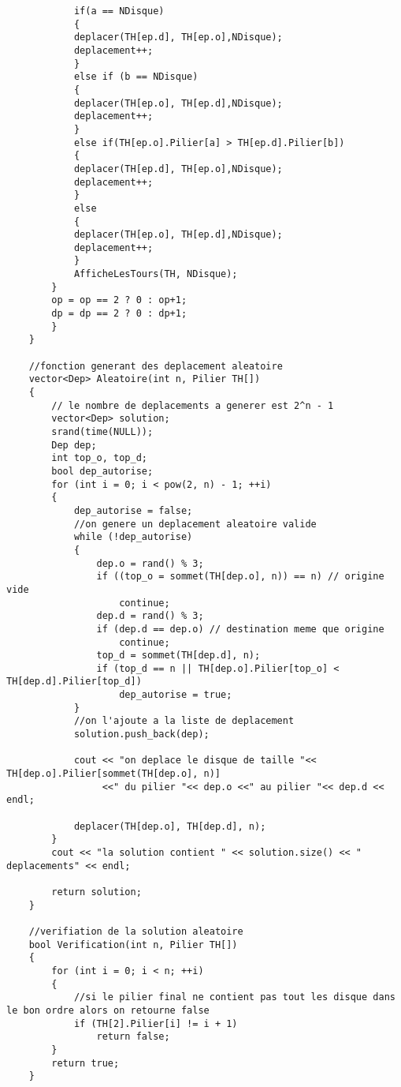 \begin{verbatim}
            if(a == NDisque)
            {
            deplacer(TH[ep.d], TH[ep.o],NDisque);
            deplacement++;
            }
            else if (b == NDisque)
            {
            deplacer(TH[ep.o], TH[ep.d],NDisque);
            deplacement++;
            }
            else if(TH[ep.o].Pilier[a] > TH[ep.d].Pilier[b])
            {
            deplacer(TH[ep.d], TH[ep.o],NDisque);
            deplacement++;
            }
            else
            {
            deplacer(TH[ep.o], TH[ep.d],NDisque);
            deplacement++;
            }
            AfficheLesTours(TH, NDisque);
        }
        op = op == 2 ? 0 : op+1; 
        dp = dp == 2 ? 0 : dp+1;
        }
    }
    
    //fonction generant des deplacement aleatoire
    vector<Dep> Aleatoire(int n, Pilier TH[])
    {
        // le nombre de deplacements a generer est 2^n - 1
        vector<Dep> solution;
        srand(time(NULL));
        Dep dep;
        int top_o, top_d;
        bool dep_autorise;
        for (int i = 0; i < pow(2, n) - 1; ++i)
        {
            dep_autorise = false;
            //on genere un deplacement aleatoire valide
            while (!dep_autorise)
            {
                dep.o = rand() % 3;
                if ((top_o = sommet(TH[dep.o], n)) == n) // origine vide
                    continue;
                dep.d = rand() % 3;
                if (dep.d == dep.o) // destination meme que origine
                    continue;
                top_d = sommet(TH[dep.d], n);
                if (top_d == n || TH[dep.o].Pilier[top_o] < TH[dep.d].Pilier[top_d])
                    dep_autorise = true;
            }
            //on l'ajoute a la liste de deplacement
            solution.push_back(dep);
    
            cout << "on deplace le disque de taille "<< TH[dep.o].Pilier[sommet(TH[dep.o], n)] 
                 <<" du pilier "<< dep.o <<" au pilier "<< dep.d << endl;
    
            deplacer(TH[dep.o], TH[dep.d], n); 
        }
        cout << "la solution contient " << solution.size() << " deplacements" << endl;
    
        return solution;
    }
    
    //verifiation de la solution aleatoire
    bool Verification(int n, Pilier TH[])
    {
        for (int i = 0; i < n; ++i)
        {
            //si le pilier final ne contient pas tout les disque dans le bon ordre alors on retourne false
            if (TH[2].Pilier[i] != i + 1)
                return false;
        }
        return true;
    }
\end{verbatim}

